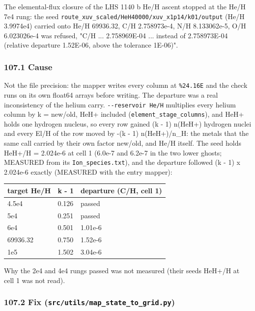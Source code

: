 \documentclass[english,a4paper]{my_memo}
\begin{document}
The elemental-flux closure of the LHS 1140 b He/H ascent stopped at the
He/H 7e4 rung: the seed \texttt{route\_xuv\_scaled/HeH40000/xuv\_x1p14/k01/output}
(He/H 3.9974e4) carried onto He/H 69936.32, C/H 2.758973e-4, N/H 8.133062e-5,
O/H 6.023026e-4 was refused, "C/H ... 2.758969E-04 ... instead of
2.758973E-04 (relative departure 1.52E-06, above the tolerance 1E-06)".

\subsubsection{107.1 Cause}\label{1071-cause}

Not the file precision: the mapper writes every column at \texttt{\%24.16E} and the
check runs on its own float64 arrays before writing. The departure was a
real inconsistency of the helium carry. \texttt{-\/-reservoir\ He/H} multiplies every
helium column by k = new/old, HeH+ included (\texttt{element\_stage\_columns}), and
HeH+ holds one hydrogen nucleus, so every row gained (k - 1) n(HeH+)
hydrogen nuclei and every El/H of the row moved by -(k - 1) n(HeH+)/n\_H:
the metals that the same call carried by their own factor new/old, and
He/H itself. The seed holds HeH+/H = 2.024e-6 at cell 1 (6.0e-7 and 6.2e-7
in the two lower ghosts; MEASURED from its \texttt{Ion\_species.txt}), and the
departure followed (k - 1) x 2.024e-6 exactly (MEASURED with the entry
mapper):

{\def\LTcaptype{none} %
{\small
\begin{longtable}[]{@{}lll@{}}
\toprule\noalign{}
target He/H & k - 1 & departure (C/H, cell 1) \\
\midrule\noalign{}
\endhead
\bottomrule\noalign{}
\endlastfoot
4.5e4 & 0.126 & passed \\
5e4 & 0.251 & passed \\
6e4 & 0.501 & 1.01e-6 \\
69936.32 & 0.750 & 1.52e-6 \\
1e5 & 1.502 & 3.04e-6 \\
\end{longtable}
}
}

Why the 2e4 and 4e4 rungs passed was not measured (their seeds\textquotesingle{} HeH+/H at
cell 1 was not read).

\subsubsection{\texorpdfstring{107.2 Fix (\texttt{src/utils/map\_state\_to\_grid.py})}{107.2 Fix (src/utils/map\_state\_to\_grid.py)}}\label{1072-fix-srcutilsmap_state_to_gridpy}
\end{document}
